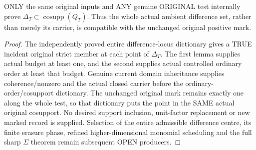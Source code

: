 \begin{theorem}
\label{hir:sharp-original-curve-ambient-difference-subset-original-cosupport}
\leanok
ONLY the same original inputs and ANY genuine ORIGINAL test internally
prove $\Delta_T\subset\operatorname{cosupp}(Q_T)$. Thus the whole actual
ambient difference set, rather than merely its carrier, is compatible
with the unchanged original positive mark.
\end{theorem}
\begin{proof}
The independently proved entire difference-locus dictionary gives a
TRUE incident original strict member at each point of $\Delta_T$.
The first lemma supplies actual budget at least one, and the second
supplies actual controlled ordinary order at least that budget. Genuine
current domain inheritance supplies coherence/nonzero and the actual
closed carrier before the ordinary-order/cosupport dictionary. The
unchanged original mark remains exactly one along the whole test, so
that dictionary puts the point in the SAME actual original cosupport.
No desired support inclusion, unit-factor replacement or new marked
record is supplied. Selection of the entire admissible difference centre,
its finite erasure phase, refined higher-dimensional monomial scheduling
and the full sharp $\Sigma$ theorem remain subsequent OPEN producers.
\end{proof}
